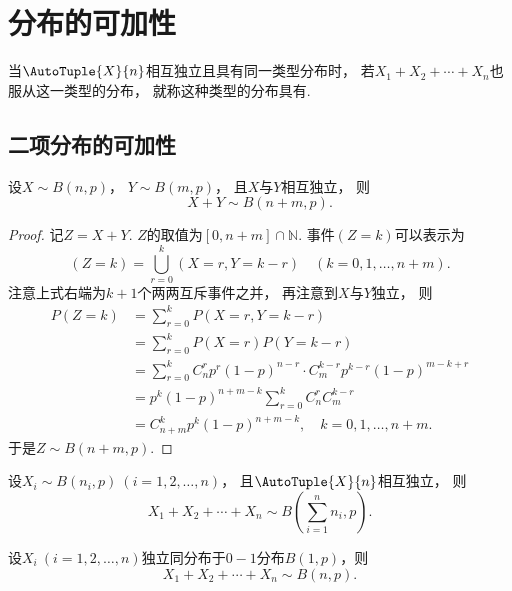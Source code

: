 \section{分布的可加性}
\begin{definition}
当\(\AutoTuple{X}{n}\)相互独立且具有同一类型分布时，
若\(X_1+X_2+\dotsb+X_n\)也服从这一类型的分布，
就称这种类型的分布具有.
\end{definition}

\subsection{二项分布的可加性}
\begin{theorem}\label{theorem:多维随机变量及其分布.二项分布的可加性1}
设\(X \sim B(n,p)\)，
\(Y \sim B(m,p)\)，
且\(X\)与\(Y\)相互独立，
则\[
	X+Y \sim B(n+m,p).
\]
\begin{proof}
记\(Z = X+Y\).
\(Z\)的取值为\([0,n+m]\cap\mathbb{N}\).
事件\((Z=k)\)可以表示为\[
	(Z=k)
	= \bigcup_{r=0}^k (X=r,Y=k-r)
	\quad(k=0,1,\dotsc,n+m).
\]
注意上式右端为\(k+1\)个两两互斥事件之并，
再注意到\(X\)与\(Y\)独立，
则\begin{align*}
	P(Z=k)
	&= \sum_{r=0}^k P(X=r,Y=k-r) \\
	&= \sum_{r=0}^k P(X=r) P(Y=k-r) \\
	&= \sum_{r=0}^k C_n^r p^r (1-p)^{n-r} \cdot C_m^{k-r} p^{k-r} (1-p)^{m-k+r} \\
	&= p^k (1-p)^{n+m-k} \sum_{r=0}^k C_n^r C_m^{k-r} \\
	&= C_{n+m}^k p^k (1-p)^{n+m-k},
	\quad k=0,1,\dotsc,n+m.
\end{align*}
于是\(Z \sim B(n+m,p)\).
\end{proof}
\end{theorem}

\begin{corollary}\label{theorem:多维随机变量及其分布.二项分布的可加性2}
设\(X_i \sim B(n_i,p)\ (i=1,2,\dotsc,n)\)，
且\(\AutoTuple{X}{n}\)相互独立，
则\[
	X_1+X_2+\dotsb+X_n \sim B\left(\sum_{i=1}^n n_i,p\right).
\]
\end{corollary}

\begin{corollary}\label{theorem:多维随机变量及其分布.二项分布的可加性3}
设\(X_i\ (i=1,2,\dotsc,n)\)独立同分布于\(0-1\)分布\(B(1,p)\)，则\[
	X_1+X_2+\dotsb+X_n \sim B(n,p).
\]
\end{corollary}

